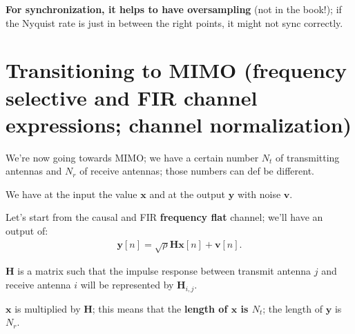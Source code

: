\documentclass[a4paper, 12pt]{book}
\begin{document}
\begin{center}
\end{center}

\textbf{For synchronization, it helps to have oversampling} (not in the book!); if the Nyquist rate is just in between the right points, it might not sync correctly.


\section[Transitioning to MIMO]{Transitioning to MIMO (frequency selective and FIR channel expressions; channel normalization)}

We're now going towards MIMO; we have a certain number $N_t$ of transmitting antennas and $N_r$ of receive antennas; those numbers can def be different.

We have at the input the value $\mathbf{x}$ and at the output $\mathbf{y}$ with noise $\mathbf{v}$.

Let's start from the causal and FIR \textbf{frequency flat} channel; we'll have an output of:
\begin{align}
\mathbf{y}[n] = \sqrt{\rho}\mathbf{H}\mathbf{x}[n] + \mathbf{v}[n]. \tag{2.81}
\end{align}

$\mathbf{H}$ is a matrix such that the impulse response between transmit antenna $j$ and receive antenna $i$ will be represented by $\mathbf{H}_{i,j}$.

\noindent{}

$\mathbf{x}$ is multiplied by $\mathbf{H}$; this means that the \textbf{length of $\mathbf{x}$ is $N_t$}; the length of $\mathbf{y}$ is $N_r$.
\end{document}
